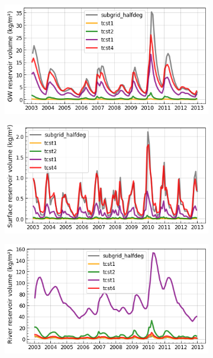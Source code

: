 \begin{figure}[htbp]
    \centering
    \begin{subfigure}[b]{0.32\textwidth}
        \caption{}
        \includegraphics[width=\linewidth]{images/eval_halfdeg/time_series/slowr_time_series_tcsts.png}
    \end{subfigure}
    \begin{subfigure}[b]{0.32\textwidth}
        \caption{}
        \includegraphics[width=\linewidth]{images/eval_halfdeg/time_series/fastr_time_series_tcsts.png}
    \end{subfigure}
    \begin{subfigure}[b]{0.32\textwidth}
        \caption{}
        \includegraphics[width=\linewidth]{images/eval_halfdeg/time_series/streamr_time_series_tcsts.png}
    \end{subfigure} \\


\end{figure}
